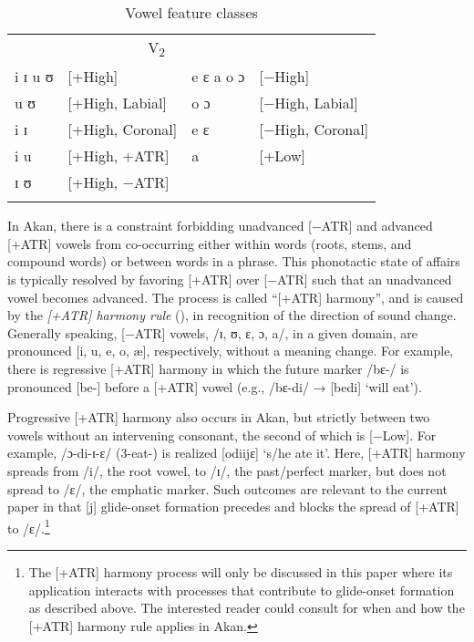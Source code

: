 \documentclass[output=paper,colorlinks,citecolor=brown]{langscibook}
\begin{document}
\begin{table}
\caption{Vowel feature classes}
\label{tab:VowelClasses}
\begin{tabular}{ ll ll }
\lsptoprule
\multicolumn{2}{c}{V\textsubscript{1}} & \multicolumn{2}{c}{V\textsubscript{2}}\\\cmidrule(lr){1-2}\cmidrule(lr){3-4}
 i ɪ u ʊ& [+High]               &  e ɛ a o ɔ& [−High]\\
 u ʊ    & [+High, Labial]       & o ɔ &  [−High, Labial]\\
 i ɪ    & [+High, Coronal]      & e ɛ &  [−High, Coronal]\\
 i u    & [+High, +ATR]         & a&  [+Low] \\
 ɪ ʊ    & [+High, −ATR]         & & \\
\lspbottomrule
\end{tabular}
\end{table} 

In Akan, there is a constraint  forbidding  unadvanced [−ATR] and advanced [+ATR] vowels from co-occurring either within words (roots, stems, and compound words) or between words in a phrase. This phonotactic state of affairs is typically resolved by favoring [+ATR] over [−ATR] such that an unadvanced vowel becomes advanced. The process is called ``[+ATR] harmony'', and is caused by  the \textit{[+ATR] harmony rule} (\cite{Dolphyne1988}), in recognition of the direction of sound change. Generally speaking, [−ATR] vowels, /ɪ, ʊ, ɛ, ɔ, a/, in a given domain, are pronounced [i, u, e, o, æ], respectively, without a meaning change. For example, there is regressive [+ATR] harmony in which the future marker /bɛ-/ is pronounced [be-] before a [+ATR] vowel (e.g., /bɛ-di/ → [bedi] ‘will eat’).\largerpage[2]

Progressive [+ATR] harmony also occurs in Akan, but strictly between two vowels without an intervening consonant, the second of which is [−Low]. For example, /ɔ-di-ɪ-ɛ/ (3-eat-) is realized [odiijɛ] `s/he ate it'. Here, [+ATR] harmony spreads from /i/, the root vowel, to /ɪ/, the past/perfect marker, but does not spread to /ɛ/, the emphatic marker. Such outcomes are relevant to the current paper in that [j] glide-onset formation precedes and blocks the spread of [+ATR] to /ɛ/.{\footnote{The [+ATR] harmony process will only be discussed in this paper where its application interacts with processes that contribute to glide-onset formation as described above. The interested reader could consult \citet[14--18]{Dolphyne1988} for when and how the [+ATR] harmony rule applies in Akan.}}
\end{document}
